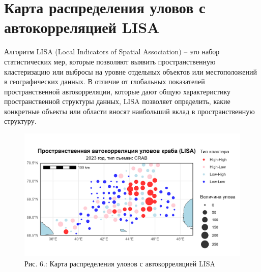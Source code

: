 \documentclass[
  letterpaper,
  DIV=11,
  numbers=noendperiod]{scrreprt}
\begin{document}
\section{Карта распределения уловов с автокорреляцией
LISA}\label{ux43aux430ux440ux442ux430-ux440ux430ux441ux43fux440ux435ux434ux435ux43bux435ux43dux438ux44f-ux443ux43bux43eux432ux43eux432-ux441-ux430ux432ux442ux43eux43aux43eux440ux440ux435ux43bux44fux446ux438ux435ux439-lisa}

Алгоритм LISA (Local Indicators of Spatial Association) -- это набор
статистических мер, которые позволяют выявить пространственную
кластеризацию или выбросы на уровне отдельных объектов или
местоположений в географических данных. В отличие от глобальных
показателей пространственной автокорреляции, которые дают общую
характеристику пространственной структуры данных, LISA позволяет
определить, какие конкретные объекты или области вносят наибольший вклад
в пространственную структуру.

\begin{figure}[H]

{\centering \includegraphics[width=0.8\linewidth,height=\textheight,keepaspectratio]{images/KARTOGRAPH6.jpg}

}

\caption{Рис. 6.: Карта распределения уловов с автокорреляцией LISA}

\end{figure}%
\end{document}
